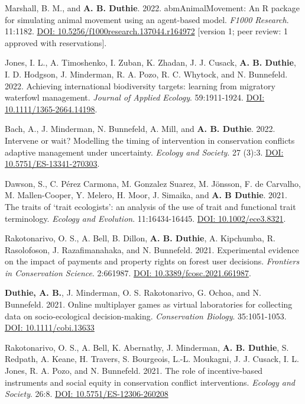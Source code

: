 \documentclass[letterpaper]{article}
\begin{document}
\begin{etaremune}
\item Marshall, B. M., and {\bf A. B. Duthie}. 2022. abmAnimalMovement: An R package for simulating animal movement using an agent-based model. {\it F1000 Research}. 11:1182. \newline \href{https://doi.org/10.5256/f1000research.137044.r164972}{DOI: 10.5256/f1000research.137044.r164972} [version 1; peer review: 1 approved with reservations].
\item Jones, I. L., A. Timoshenko, I. Zuban, K. Zhadan, J. J. Cusack, {\bf A. B. Duthie}, I. D. Hodgson, J. Minderman, R. A. Pozo, R. C. Whytock, and N. Bunnefeld. 2022. Achieving international biodiversity targets: learning from migratory waterfowl management. {\it Journal of Applied Ecology}. 59:1911-1924. \href{https://besjournals.onlinelibrary.wiley.com/doi/10.1111/1365-2664.14198}{DOI: 10.1111/1365-2664.14198}.
\item Bach, A., J. Minderman, N. Bunnefeld, A. Mill, and {\bf A. B. Duthie}. 2022. Intervene or wait? Modelling the timing of intervention in conservation conflicts adaptive management under uncertainty. {\it Ecology and Society}. 27 (3):3. \href{https://ecologyandsociety.org/vol27/iss3/art3/}{DOI: 10.5751/ES-13341-270303}.
\item Dawson, S., C. P\'{e}rez Carmona, M. Gonzalez Suarez, M. J\"{o}nsson, F. de Carvalho, M. Mallen-Cooper, Y. Melero, H. Moor, J. Simaika, and {\bf A. B Duthie}. 2021. The traits of `trait ecologists': an analysis of the use of trait and functional trait terminology. {\it Ecology and Evolution}. 11:16434-16445. \href{https://onlinelibrary.wiley.com/doi/10.1002/ece3.8321}{DOI: 10.1002/ece3.8321}.
\item Rakotonarivo, O. S., A. Bell, B. Dillon, {\bf A. B. Duthie}, A. Kipchumba, R. Rasolofoson, J. Razafimanahaka, and N. Bunnefeld. 2021. Experimental evidence on the impact of payments and property rights on forest user decisions. {\it Frontiers in Conservation Science}. 2:661987. \href{https://doi.org/10.3389/fcosc.2021.661987}{DOI: 10.3389/fcosc.2021.661987}.
\item {\bf Duthie, A. B.}, J. Minderman, O. S. Rakotonarivo, G. Ochoa, and N. Bunnefeld. 2021. Online multiplayer games as virtual laboratories for collecting data on socio-ecological decision-making. {\it Conservation Biology}. 35:1051-1053. \href{https://doi.org/10.1111/cobi.13633}{DOI: 10.1111/cobi.13633}
\item Rakotonarivo, O. S., A. Bell, K. Abernathy, J. Minderman, {\bf A. B. Duthie}, S. Redpath, A. Keane, H. Travers, S. Bourgeois, L.-L. Moukagni, J. J. Cusack, I. L. Jones, R. A. Pozo, and N. Bunnefeld. 2021. The role of incentive-based instruments and social equity in conservation conflict interventions. {\it Ecology and Society}. 26:8. \href{https://www.ecologyandsociety.org/vol26/iss2/art8/}{DOI: 10.5751/ES-12306-260208}

\end{etaremune}
\end{document}
